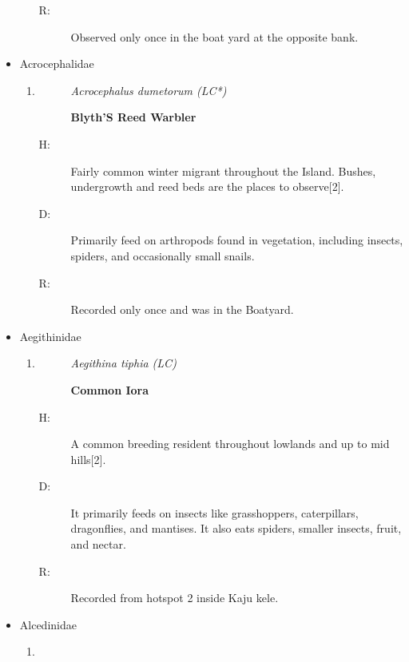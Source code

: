 \begin{itemize}
\begin{enumerate}
\begin{description}
\item[R: ]%
Observed only once in the boat yard at the opposite bank.%
\end{description}%
\end{enumerate}%
\item%
Acrocephalidae%
\begin{enumerate}%
\item%
\begin{description}%
\item[]%
\textit{Acrocephalus dumetorum (LC*)}%
\item[]%
\textbf{Blyth'S Reed Warbler}%
\end{description}%
\begin{description}%
\item[H: ]%
Fairly common winter migrant throughout the Island. Bushes, undergrowth and reed beds are the places to observe{[}2{]}.%
\item[D: ]%
Primarily feed on arthropods found in vegetation, including insects, spiders, and occasionally small snails.%
\item[R: ]%
Recorded only once and was in the Boatyard.%
\end{description}%
\end{enumerate}%
\item%
Aegithinidae%
\begin{enumerate}%
\item%
\begin{description}%
\item[]%
\textit{Aegithina tiphia (LC)}%
\item[]%
\textbf{Common Iora}%
\end{description}%
\begin{description}%
\item[H: ]%
A common breeding resident throughout lowlands and up to mid hills{[}2{]}.%
\item[D: ]%
It primarily feeds on insects like grasshoppers, caterpillars, dragonflies, and mantises. It also eats spiders, smaller insects, fruit, and nectar.%
\item[R: ]%
Recorded from hotspot 2 inside Kaju kele.%
\end{description}%
\end{enumerate}%
\item%
Alcedinidae%
\begin{enumerate}%
\item%
\begin{description}%
\item[]%

\end{description}
\end{enumerate}
\end{itemize}
